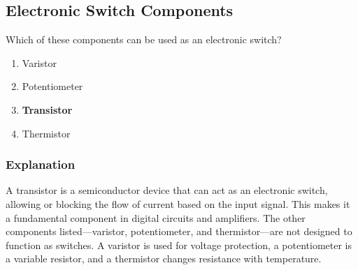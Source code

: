 \subsection{Electronic Switch Components}
\label{T6B03}

\begin{tcolorbox}[colback=gray!10!white,colframe=black!75!black,title=T6B03]
Which of these components can be used as an electronic switch?
\begin{enumerate}[noitemsep]
    \item Varistor
    \item Potentiometer
    \item \textbf{Transistor}
    \item Thermistor
\end{enumerate}
\end{tcolorbox}

\subsubsection*{Explanation}
A transistor is a semiconductor device that can act as an electronic switch, allowing or blocking the flow of current based on the input signal. This makes it a fundamental component in digital circuits and amplifiers. The other components listed—varistor, potentiometer, and thermistor—are not designed to function as switches. A varistor is used for voltage protection, a potentiometer is a variable resistor, and a thermistor changes resistance with temperature.